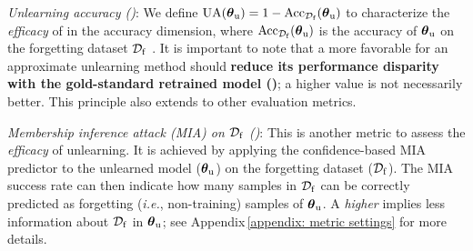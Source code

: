 \noindent {} \textit{Unlearning accuracy (\textbf{\UA})}: 
We define $\mathrm{{\text{UA}}}(\boldsymbol \theta_\mathrm{u}) = 1-\mathrm{Acc}_{\mathcal D_\mathrm{f}} (\boldsymbol \theta_\mathrm{u})$ to characterize the \textit{efficacy} of {\MU} in the accuracy dimension, where $\mathrm{Acc}_{\mathcal D_\mathrm{f}} (\boldsymbol \theta_\mathrm{u})$ is the  accuracy  of $\boldsymbol \theta_\mathrm{u}$ on the forgetting dataset  $\mathcal D_\mathrm{f}$ \cite{golatkar2020eternal,graves2021amnesiac}.
It is important to note that a more favorable {\UA}   for an approximate unlearning method should   \textbf{reduce its performance disparity  with  the gold-standard retrained model (\retrain)}; a higher value is not necessarily better. This principle also extends to other evaluation metrics.




\noindent {} \textit{Membership inference attack (MIA)  on  $\mathcal D_\mathrm{f}$ (\textbf{\MIAF})}:   This is another metric   to assess the \textit{efficacy} of unlearning.
It is achieved by applying the   confidence-based MIA predictor \cite{song2019privacy,yeom2018privacy} to the unlearned model ($\boldsymbol \theta_\mathrm{u}$) on the forgetting dataset ($\mathcal D_\mathrm{f}$). The MIA success rate can then indicate how many samples in $\mathcal D_\mathrm{f}$ can be correctly predicted as forgetting (\textit{i.e.}, non-training) samples of $\boldsymbol \theta_\mathrm{u}$.
 A \textit{higher} {\MIAF}   implies    less information about   $\mathcal D_\mathrm{f}$     in $\boldsymbol \theta_\mathrm{u}$; see Appendix\,\ref{appendix: metric settings} for more details.







